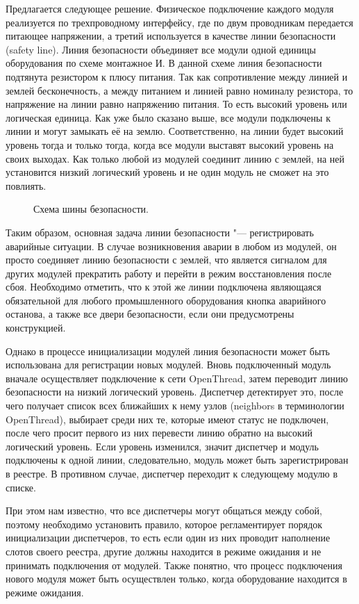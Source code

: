 Предлагается следующее решение. Физическое подключение каждого модуля реализуется по трехпроводному интерфейсу, где по двум проводникам передается питающее напряжении, а третий используется в качестве линии безопасности (safety line). Линия безопасности объединяет все модули одной единицы оборудования по схеме монтажное И. В данной схеме линия безопасности подтянута резистором к плюсу питания. Так как сопротивление между линией и землей бесконечность, а между питанием и линией равно номиналу резистора, то напряжение на линии равно напряжению питания. То есть высокий уровень или логическая единица. Как уже было сказано выше, все модули подключены к линии и могут замыкать её на землю. Соответственно, на линии будет высокий уровень тогда и только тогда, когда все модули выставят высокий уровень на своих выходах. Как только любой из модулей соединит линию с землей, на ней установится низкий логический уровень и не один модуль не сможет на это повлиять.

\begin{figure}[ht]
\caption{Схема шины безопасности.}\label{fig:logic-and}
\end{figure}

Таким образом, основная задача линии безопасности "--- регистрировать аварийные ситуации. В случае возникновения аварии в любом из модулей, он просто соединяет линию безопасности с землей, что является сигналом для других модулей прекратить работу и перейти в режим восстановления после сбоя. Необходимо отметить, что к этой же линии подключена являющаяся обязательной для любого промышленного оборудования кнопка аварийного останова, а также все двери безопасности, если они предусмотрены конструкцией.

Однако в процессе инициализации модулей линия безопасности может быть использована для регистрации новых модулей. Вновь подключенный модуль вначале осуществляет подключение к сети OpenThread, затем переводит линию безопасности на низкий логический уровень. Диспетчер детектирует это, после чего получает список всех ближайших к нему узлов (neighbors в терминологии OpenThread), выбирает среди них те, которые имеют статус не подключен, после чего просит первого из них перевести линию обратно на высокий логический уровень. Если уровень изменился, значит диспетчер и модуль подключены к одной линии, следовательно, модуль может быть зарегистрирован в реестре. В противном случае, диспетчер переходит к следующему модулю в списке.

При этом нам известно, что все диспетчеры могут общаться между собой, поэтому необходимо установить правило, которое регламентирует порядок инициализации диспетчеров, то есть если один из них проводит наполнение слотов своего реестра, другие должны находится в режиме ожидания и не принимать подключения от модулей. Также понятно, что процесс подключения нового модуля может быть осуществлен только, когда оборудование находится в режиме ожидания.


